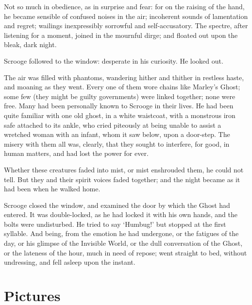 \documentclass[11pt,twoside]{article}\makeatletter
\makeatletter
\renewcommand\section{\@startsection {section}{1}{\z@}%
     {-1.75ex \@plus -0.5ex \@minus -.2ex}%
     {0.5ex \@plus .2ex}%
     {\reset@font\Large\bfseries\sffamily}}
\def\DivI{\section}
\def\DivI{\chapter}
\makeatother
\begin{document}
Not so much in obedience, as in surprise and fear: for on the raising of the hand, he became sensible of confused noises in the air; incoherent sounds of lamentation and regret; wailings inexpressibly sorrowful and self-accusatory. The spectre, after listening for a moment, joined in the mournful dirge; and floated out upon the bleak, dark night. \par
Scrooge followed to the window: desperate in his curiosity. He looked out. \par
The air was filled with phantoms, wandering hither and thither in restless haste, and moaning as they went. Every one of them wore chains like Marley's Ghost; some few (they might be guilty governments) were linked together; none were free. Many had been personally known to Scrooge in their lives. He had been quite familiar with one old ghost, in a white waistcoat, with a monstrous iron safe attached to its ankle, who cried piteously at being unable to assist a wretched woman with an  infant, whom it saw below, upon a door-step. The misery with them all was, clearly, that they sought to interfere, for good, in human matters, and had lost the power for ever. \par
Whether these creatures faded into mist, or mist enshrouded them, he could not tell. But they and their spirit voices faded together; and the night became as it had been when he walked home. \par
Scrooge closed the window, and examined the door by which the Ghost had entered. It was double-locked, as he had locked it with his own hands, and the bolts were undisturbed. He tried to say ‘Humbug!’ but stopped at the first syllable. And being, from the emotion he had undergone, or the fatigues of the day, or his glimpse of the Invisible World, or the dull conversation of the Ghost, or the lateness of the hour, much in need of repose; went straight to bed, without undressing, and fell asleep upon the instant.
\DivI[Pictures]{Pictures} \par 
\end{document}
